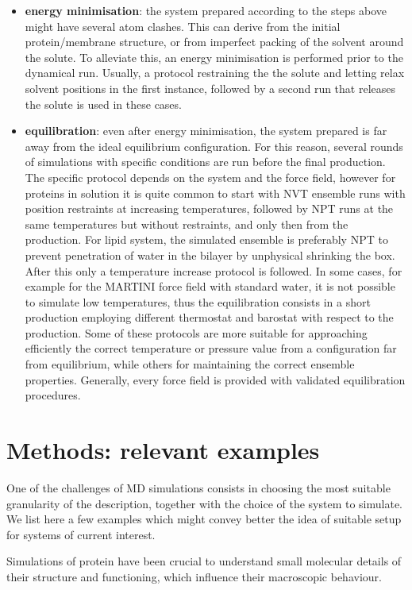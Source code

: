 \documentclass[graybox]{svmult}
\begin{document}
\begin{itemize}
\item \textbf{energy minimisation}: the system prepared according to the steps above might have several atom clashes. This can derive from the initial protein/membrane structure, or from imperfect packing of the solvent around the solute. To alleviate this, an energy minimisation is performed prior to the dynamical run. Usually, a protocol restraining the  the solute and letting relax solvent positions in the first instance, followed by a second run that releases the solute is used in these cases.
\item \textbf{equilibration}: even after energy minimisation, the system prepared is far away from the ideal equilibrium configuration. For this reason, several rounds of simulations with specific conditions are run before the final production. The specific protocol depends on the system and the force field, however for proteins in solution it is quite common to start with NVT ensemble runs with position restraints at increasing temperatures, followed by NPT runs at the same temperatures but without restraints, and only then from the production. For lipid system, the simulated ensemble is preferably NPT to prevent penetration of water in the bilayer by unphysical shrinking the box. After this only a temperature increase protocol is followed. In some cases, for example for the MARTINI force field with standard water, it is not possible to simulate low temperatures, thus the equilibration consists in a short production employing different thermostat and barostat with respect to the production. Some of these protocols are more suitable for approaching efficiently the correct temperature or pressure value from a configuration far from equilibrium, while others for maintaining the correct ensemble properties. Generally, every force field is provided with validated equilibration procedures.
\end{itemize}


\section{Methods: relevant examples} \label{sec:methods}
One of the challenges of MD simulations consists in choosing the most suitable granularity of the description, together with the choice of the system to simulate. We list here a few examples which might convey better the idea of suitable setup  for systems of current interest.

Simulations of protein have been crucial to understand small molecular details of their structure and functioning, which influence their macroscopic behaviour.
\end{document}
